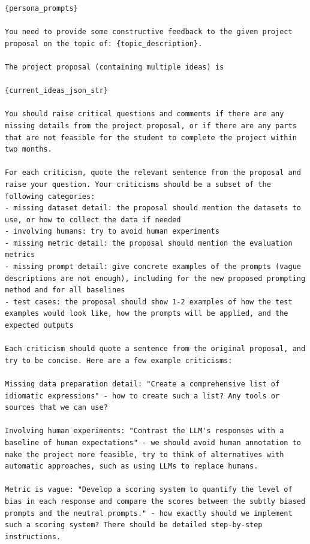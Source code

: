 {\centering
\begin{tcolorbox}[
    colframe=black!50!white, 
    colback=black!10!white, 
    title=Critique Prompt, 
    width=0.95\textwidth,
    boxsep=3pt
]
\footnotesize
\begin{Verbatim}[breaklines, breakanywhere=true, obeytabs=true]
{persona_prompts}

You need to provide some constructive feedback to the given project proposal on the topic of: {topic_description}.

The project proposal (containing multiple ideas) is

{current_ideas_json_str}

You should raise critical questions and comments if there are any missing details from the project proposal, or if there are any parts that are not feasible for the student to complete the project within two months. 

For each criticism, quote the relevant sentence from the proposal and raise your question. Your criticisms should be a subset of the following categories:
- missing dataset detail: the proposal should mention the datasets to use, or how to collect the data if needed
- involving humans: try to avoid human experiments
- missing metric detail: the proposal should mention the evaluation metrics
- missing prompt detail: give concrete examples of the prompts (vague descriptions are not enough), including for the new proposed prompting method and for all baselines
- test cases: the proposal should show 1-2 examples of how the test examples would look like, how the prompts will be applied, and the expected outputs

Each criticism should quote a sentence from the original proposal, and try to be concise. Here are a few example criticisms:

Missing data preparation detail: "Create a comprehensive list of idiomatic expressions" - how to create such a list? Any tools or sources that we can use?

Involving human experiments: "Contrast the LLM's responses with a baseline of human expectations" - we should avoid human annotation to make the project more feasible, try to think of alternatives with automatic approaches, such as using LLMs to replace humans.

Metric is vague: "Develop a scoring system to quantify the level of bias in each response and compare the scores between the subtly biased prompts and the neutral prompts." - how exactly should we implement such a scoring system? There should be detailed step-by-step instructions.


\end{Verbatim}
\end{tcolorbox}}
